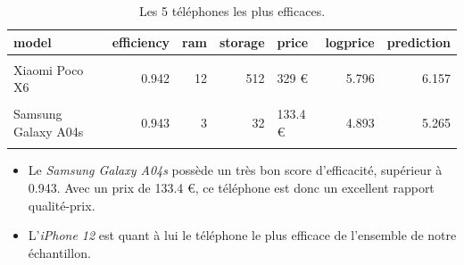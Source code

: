\documentclass[
  12pt,
]{report}
\begin{document}
\begin{table}[!h]
\centering
\caption{\label{tab:best}Les 5 téléphones les plus efficaces.}
\centering
\begin{tabular}[t]{lrrrlrr}
\toprule
\textbf{model} & \textbf{efficiency} & \textbf{ram} & \textbf{storage} & \textbf{price} & \textbf{logprice} & \textbf{prediction}\\
\midrule
\cellcolor{gray!10}{Google Pixel 6 Pro} & \cellcolor{gray!10}{0.941} & \cellcolor{gray!10}{12} & \cellcolor{gray!10}{128} & \cellcolor{gray!10}{562.86 €} & \cellcolor{gray!10}{6.333} & \cellcolor{gray!10}{6.671}\\
Xiaomi Poco X6 & 0.942 & 12 & 512 & 329 € & 5.796 & 6.157\\
\cellcolor{gray!10}{iPhone 8 Plus} & \cellcolor{gray!10}{0.943} & \cellcolor{gray!10}{3} & \cellcolor{gray!10}{64} & \cellcolor{gray!10}{299 €} & \cellcolor{gray!10}{5.700} & \cellcolor{gray!10}{6.063}\\
Samsung Galaxy A04s & 0.943 & 3 & 32 & 133.4 € & 4.893 & 5.265\\
\cellcolor{gray!10}{iPhone 12} & \cellcolor{gray!10}{0.948} & \cellcolor{gray!10}{4} & \cellcolor{gray!10}{128} & \cellcolor{gray!10}{390 €} & \cellcolor{gray!10}{5.966} & \cellcolor{gray!10}{6.409}\\
\bottomrule
\end{tabular}
\end{table}

\begin{itemize}
\item
  Le \emph{Samsung Galaxy A04s} possède un très bon score d'efficacité,
  supérieur à 0.943. Avec un prix de 133.4 €, ce téléphone est donc un
  excellent rapport qualité-prix.
\item
  L'\emph{iPhone 12} est quant à lui le téléphone le plus efficace de
  l'ensemble de notre échantillon.
\end{itemize}

\newpage
\end{document}
